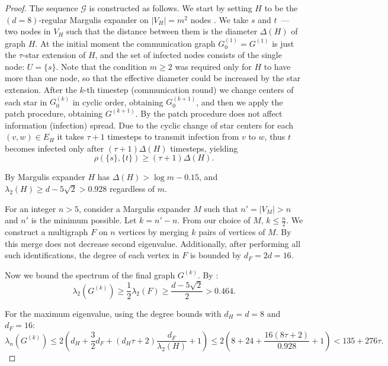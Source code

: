 \documentclass[a4paper,USenglish,cleveref, autoref, thm-restate]{lipics-v2021}
\newcommand{\cG}{{\mathcal G}}
\begin{document}
\begin{proof}
The sequence $\cG$ is constructed as follows. 
We start by setting $H$ to be the $(d = 8)$-regular Margulis expander on $|V_H| = m^2$ nodes \cite[Theorem 8.2]{hoory2006expander}.
We take $s$ and $t$~--- two nodes in $V_H$ such that the distance between them is the diameter $\Delta(H)$ of graph $H$. 
At the initial moment the communication graph $G_0^{(1)} = G^{(1)}$ is just the $\tau$-star extension of $H$, and the set of infected nodes consists of the single node: $U =\{s\}$.
Note that the condition $m\geq 2$ was required only for $H$ to have more than one node, so that the effective diameter could be increased by the star extension.
After the $k$-th timestep (communication round) we change centers of each star in $G_0^{(k)}$ in cyclic order, obtaining $G_0^{(k+1)}$, and then we apply the patch procedure, obtaining $G^{(k+1)}$.
By  the patch procedure does not affect information (infection) spread.
Due to the cyclic change of star centers for each $(v, w) \in E_H$ it takes $\tau + 1$ timesteps to transmit infection from $v$ to $w$, thus $t$ becomes infected only after $(\tau + 1) \Delta(H)$ timesteps, yielding
\begin{equation}\label{eq:diams-G-H}
   \rho\left(\{s\}, \{t\}\right) \geq (\tau + 1) \Delta(H). 
\end{equation}

By  Margulis expander $H$ has $\Delta(H) > \log m - 0.15$, and $\lambda_2(H) \geq d - 5 \sqrt{2} > 0.928$ regardless of $m$.

For an integer $n>5$, consider a Margulis expander $M$ such that $n' = |V_M| > n$ and $n'$ is the minimum possible. Let $k = n' - n$. From our choice of $M$, $k \le \frac{n}{2}$.
We construct a multigraph $F$ on $n$ vertices by merging $k$ pairs of vertices of $M$. By  this merge does not decrease second eigenvalue. Additionally, after performing all such identifications, the degree of each vertex in $F$ is bounded by $d_F = 2d = 16$.


Now we bound the spectrum of the final graph $G^{(k)}$. By :
\begin{equation}
    \lambda_2(G^{(k)}) \geq \frac{1}{2}\lambda_2(F) \geq \frac{d - 5\sqrt{2}}{2} > 0.464.
\end{equation}

For the maximum eigenvalue, using the degree bounds with $d_H = d = 8$ and $d_F = 16$:
\begin{equation}
    \lambda_n(G^{(k)}) \leq 2\left(d_H + \frac{3}{2}d_F + (d_H\tau + 2)\frac{d_F}{\lambda_2(H)} + 1\right) \leq 2\left(8 + 24 + \frac{16(8\tau + 2)}{0.928} + 1\right) < 135 + 276\tau.
\end{equation}


\end{proof}
\end{document}
